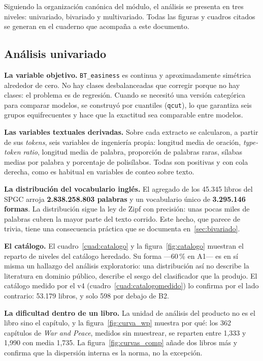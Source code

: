 \documentclass[11pt,a4paper]{article}
\newcommand{\cod}[1]{\texttt{\small #1}}
\newcommand{\pct}{\,\%}
\begin{document}
Siguiendo la organización canónica del módulo, el análisis se presenta en tres niveles:
univariado, bivariado y multivariado. Todas las figuras y cuadros citados se generan en
el cuaderno que acompaña a este documento.

\subsection{Análisis univariado}

\textbf{La variable objetivo.} \cod{BT\_easiness} es continua y aproximadamente
simétrica alrededor de cero. No hay clases desbalanceadas que corregir porque no hay
clases: el problema es de regresión. Cuando se necesitó una versión categórica para
comparar modelos, se construyó por cuantiles (\cod{qcut}), lo que garantiza seis grupos
equifrecuentes y hace que la exactitud sea comparable entre modelos.

\textbf{Las variables textuales derivadas.} Sobre cada extracto se calcularon, a partir
de sus \emph{tokens}, seis variables de ingeniería propia: longitud media de oración,
\emph{type-token ratio}, longitud media de palabra, proporción de palabras raras,
sílabas medias por palabra y porcentaje de polisílabos. Todas son positivas y con cola
derecha, como es habitual en variables de conteo sobre texto.

\textbf{La distribución del vocabulario inglés.} El agregado de los 45.345 libros del
SPGC arroja \textbf{2.838.258.803 palabras} y un vocabulario único de
\textbf{3.295.146 formas}. La distribución sigue la ley de Zipf
\parencite{zipf1949human} con precisión: unas pocas miles de palabras cubren la mayor
parte del texto corrido. Este hecho, que parece de trivia, tiene una consecuencia
práctica que se documenta en~\ref{sec:bivariado}.

\textbf{El catálogo.} El cuadro~\ref{cuad:catalogo} y la figura~\ref{fig:catalogo}
muestran el reparto de niveles del catálogo heredado. Su forma —60\pct{} en A1— es en sí
misma un hallazgo del análisis exploratorio: una distribución así no describe la
literatura en dominio público, describe el sesgo del clasificador que la produjo. El
catálogo medido por el v4 (cuadro~\ref{cuad:catalogomedido}) lo confirma por el lado
contrario: 53.179 libros, y solo 598 por debajo de B2.

\textbf{La dificultad dentro de un libro.} La unidad de análisis del producto no es el
libro sino el capítulo, y la figura~\ref{fig:curva_wp} muestra por qué: los 362
capítulos de \emph{War and Peace}, medidos sin muestrear, se reparten entre 1,333 y
1,990 con media 1,735. La figura~\ref{fig:curvas_comp} añade dos libros más y confirma
que la dispersión interna es la norma, no la excepción.
\end{document}

